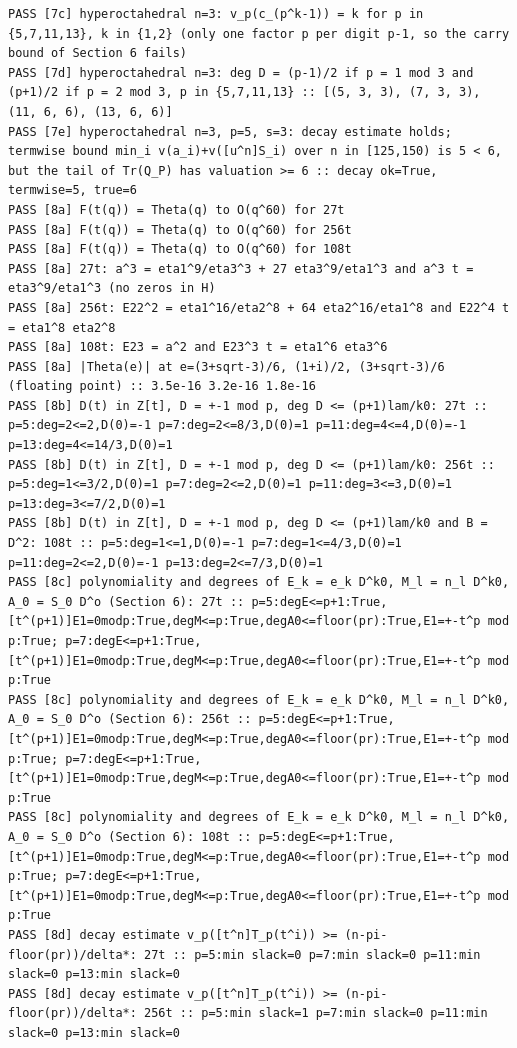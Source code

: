 \documentclass[11pt,a4paper]{article}
\theoremstyle{definition}\newtheorem{definition}[theorem]{Definition}
\theoremstyle{remark}\newtheorem{remark}[theorem]{Remark}
\numberwithin{equation}{section}
\begin{document}
\begin{lstlisting}
PASS [7c] hyperoctahedral n=3: v_p(c_(p^k-1)) = k for p in {5,7,11,13}, k in {1,2} (only one factor p per digit p-1, so the carry bound of Section 6 fails)
PASS [7d] hyperoctahedral n=3: deg D = (p-1)/2 if p = 1 mod 3 and (p+1)/2 if p = 2 mod 3, p in {5,7,11,13} :: [(5, 3, 3), (7, 3, 3), (11, 6, 6), (13, 6, 6)]
PASS [7e] hyperoctahedral n=3, p=5, s=3: decay estimate holds; termwise bound min_i v(a_i)+v([u^n]S_i) over n in [125,150) is 5 < 6, but the tail of Tr(Q_P) has valuation >= 6 :: decay ok=True, termwise=5, true=6
PASS [8a] F(t(q)) = Theta(q) to O(q^60) for 27t
PASS [8a] F(t(q)) = Theta(q) to O(q^60) for 256t
PASS [8a] F(t(q)) = Theta(q) to O(q^60) for 108t
PASS [8a] 27t: a^3 = eta1^9/eta3^3 + 27 eta3^9/eta1^3 and a^3 t = eta3^9/eta1^3 (no zeros in H)
PASS [8a] 256t: E22^2 = eta1^16/eta2^8 + 64 eta2^16/eta1^8 and E22^4 t = eta1^8 eta2^8
PASS [8a] 108t: E23 = a^2 and E23^3 t = eta1^6 eta3^6
PASS [8a] |Theta(e)| at e=(3+sqrt-3)/6, (1+i)/2, (3+sqrt-3)/6 (floating point) :: 3.5e-16 3.2e-16 1.8e-16
PASS [8b] D(t) in Z[t], D = +-1 mod p, deg D <= (p+1)lam/k0: 27t :: p=5:deg=2<=2,D(0)=-1 p=7:deg=2<=8/3,D(0)=1 p=11:deg=4<=4,D(0)=-1 p=13:deg=4<=14/3,D(0)=1
PASS [8b] D(t) in Z[t], D = +-1 mod p, deg D <= (p+1)lam/k0: 256t :: p=5:deg=1<=3/2,D(0)=1 p=7:deg=2<=2,D(0)=1 p=11:deg=3<=3,D(0)=1 p=13:deg=3<=7/2,D(0)=1
PASS [8b] D(t) in Z[t], D = +-1 mod p, deg D <= (p+1)lam/k0 and B = D^2: 108t :: p=5:deg=1<=1,D(0)=-1 p=7:deg=1<=4/3,D(0)=1 p=11:deg=2<=2,D(0)=-1 p=13:deg=2<=7/3,D(0)=1
PASS [8c] polynomiality and degrees of E_k = e_k D^k0, M_l = n_l D^k0, A_0 = S_0 D^o (Section 6): 27t :: p=5:degE<=p+1:True,[t^(p+1)]E1=0modp:True,degM<=p:True,degA0<=floor(pr):True,E1=+-t^p mod p:True; p=7:degE<=p+1:True,[t^(p+1)]E1=0modp:True,degM<=p:True,degA0<=floor(pr):True,E1=+-t^p mod p:True
PASS [8c] polynomiality and degrees of E_k = e_k D^k0, M_l = n_l D^k0, A_0 = S_0 D^o (Section 6): 256t :: p=5:degE<=p+1:True,[t^(p+1)]E1=0modp:True,degM<=p:True,degA0<=floor(pr):True,E1=+-t^p mod p:True; p=7:degE<=p+1:True,[t^(p+1)]E1=0modp:True,degM<=p:True,degA0<=floor(pr):True,E1=+-t^p mod p:True
PASS [8c] polynomiality and degrees of E_k = e_k D^k0, M_l = n_l D^k0, A_0 = S_0 D^o (Section 6): 108t :: p=5:degE<=p+1:True,[t^(p+1)]E1=0modp:True,degM<=p:True,degA0<=floor(pr):True,E1=+-t^p mod p:True; p=7:degE<=p+1:True,[t^(p+1)]E1=0modp:True,degM<=p:True,degA0<=floor(pr):True,E1=+-t^p mod p:True
PASS [8d] decay estimate v_p([t^n]T_p(t^i)) >= (n-pi-floor(pr))/delta*: 27t :: p=5:min slack=0 p=7:min slack=0 p=11:min slack=0 p=13:min slack=0
PASS [8d] decay estimate v_p([t^n]T_p(t^i)) >= (n-pi-floor(pr))/delta*: 256t :: p=5:min slack=1 p=7:min slack=0 p=11:min slack=0 p=13:min slack=0

\end{lstlisting}
\end{document}
